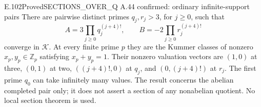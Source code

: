 
\begin{result}{E.102}{Proved}{SECTIONS\_OVER\_Q A.44 confirmed: ordinary infinite-support pairs}
There are pairwise distinct primes $q_j,r_j>3$, for $j\ge0$, such that
\[
A=3\prod_{j\ge0}q_j^{(j+4)!},\qquad
B=-2\prod_{j\ge0}r_j^{(j+4)!}
\]
converge in $\mathcal K$. At every finite prime $p$ they are the Kummer
classes of nonzero $x_p,y_p\in\mathbb Z_p$ satisfying $x_p+y_p=1$.
Their nonzero valuation vectors are $(1,0)$ at three, $(0,1)$ at two,
$((j+4)!,0)$ at $q_j$, and $(0,(j+4)!)$ at $r_j$. The first prime
$q_0$ can take infinitely many values. The result concerns the abelian
completed pair only; it does not assert a section of any nonabelian
quotient. No local section theorem is used.
\end{result}
